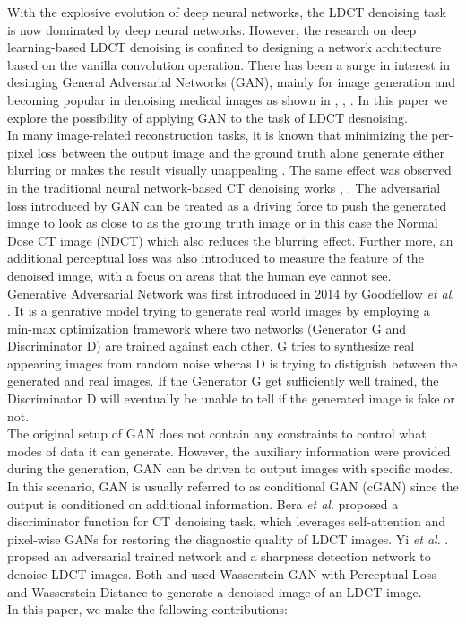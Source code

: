 \documentclass[journal]{IEEEtran}
\begin{document}
With the explosive evolution of deep neural networks, the LDCT denoising task is now dominated by deep neural networks.  However, the research on deep learning-based LDCT denoising is confined to designing a network architecture based on the vanilla convolution operation.  There has been a surge in interest in desinging General Adversarial Networks (GAN), mainly for image generation and becoming popular in denoising medical images as shown in \cite{8340157}, \cite{9474492}, \cite{yin2021unpaired}.  In this paper we explore the possibility of applying GAN to the task of LDCT desnoising.\\
	In many image-related reconstruction tasks, it is known that minimizing the per-pixel loss between the output image and the ground truth alone generate either blurring or makes the result visually unappealing \cite{huang2017beyond}.  The same effect was observed in the traditional neural network-based CT denoising works \cite{chen2017low}, \cite{chen2017low2}.  The adversarial loss introduced by GAN can be treated as a driving force to push the generated image to look as close to as the groung truth image or in this case the Normal Dose CT image (NDCT) which also reduces the blurring effect. Further more, an additional perceptual loss was also introduced to measure the feature of the denoised image, with a focus on areas that the human eye cannot see. \\
Generative Adversarial Network was first introduced in 2014 by Goodfellow \emph{et al}. \cite{goodfellow2014generative}.  It is a genrative model trying to generate real world images by employing a min-max optimization framework where two networks (Generator G and Discriminator D) are trained against each other.  G tries to synthesize real appearing images from random noise wheras D is trying to distiguish between the generated and real images.  If the Generator G get sufficiently well trained, the Discriminator D will eventually be unable to tell if the generated image is fake or not.\\
	The original setup of GAN does not contain any constraints to control what modes of data it can generate.  However, the auxiliary information were provided during the generation, GAN can be driven to output images with specific modes.  In this scenario, GAN is usually referred to as conditional GAN (cGAN) since the output is conditioned on additional information.  Bera \emph{et al}. \cite{9474492} proposed a discriminator function for CT denoising task, which leverages self-attention and pixel-wise GANs for restoring the diagnostic quality of LDCT images.  Yi \emph{et al}. \cite{yi2018sharpness}. propsed an adversarial trained network and a sharpness detection network to denoise LDCT images. Both \cite{8340157} and \cite{yin2021unpaired} used Wasserstein GAN with Perceptual Loss and Wasserstein Distance to generate a denoised image of an LDCT image. \\
	In this paper, we make the following contributions:
	
\end{document}
